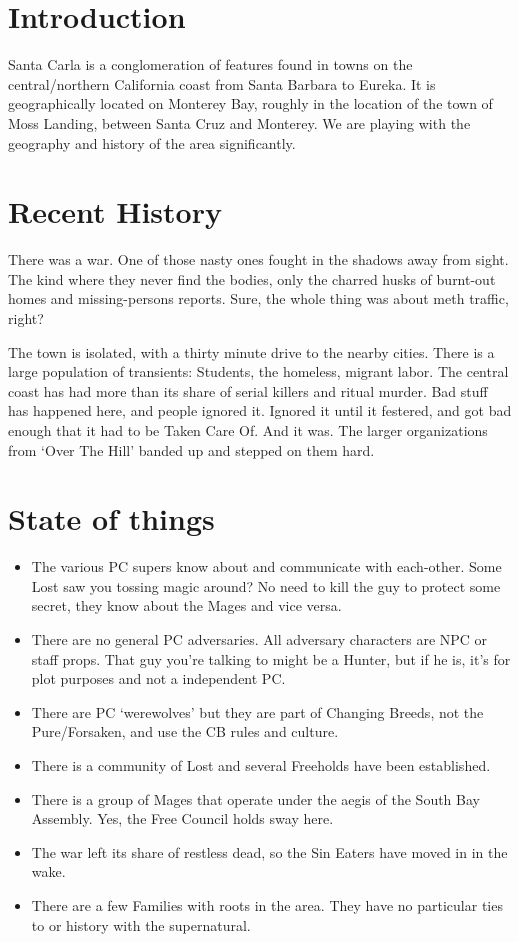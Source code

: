 \section{Introduction}
Santa Carla is a conglomeration of features found in towns on the central/northern California coast from Santa Barbara to Eureka. It is geographically located on Monterey Bay, roughly in the location of the town of Moss Landing, between Santa Cruz and Monterey. We are playing with the geography and history of the area significantly.
\section{Recent History}
There was a war. One of those nasty ones fought in the shadows away from sight. The kind where they never find the bodies, only the charred husks of burnt-out homes and missing-persons reports. Sure, the whole thing was about meth traffic, right?

The town is isolated, with a thirty minute drive to the nearby cities. There is a large population of transients: Students, the homeless, migrant labor. The central coast has had more than its share of serial killers and ritual murder. Bad stuff has happened here, and people ignored it. Ignored it until it festered, and got bad enough that it had to be Taken Care Of. And it was. The larger organizations from `Over The Hill' banded up and stepped on them hard.
\section{State of things}

\begin{itemize}
\item The various PC supers know about and communicate with each-other. Some Lost saw you tossing magic around? No need to kill the guy to protect some secret, they know about the Mages and vice versa.
\item There are no general PC adversaries. All adversary characters are NPC or staff props. That guy you're talking to might be a Hunter, but if he is, it's for plot purposes and not a independent PC.
\item There are PC `werewolves' but they are part of Changing Breeds, not the Pure/Forsaken, and use the CB rules and culture.
\item There is a community of Lost and several Freeholds have been established.
\item There is a group of Mages that operate under the aegis of the South Bay Assembly. Yes, the Free Council holds sway here.
\item The war left its share of restless dead, so the Sin Eaters have moved in in the wake.
\item There are a few Families with roots in the area. They have no particular ties to or history with the supernatural.
\end{itemize}
